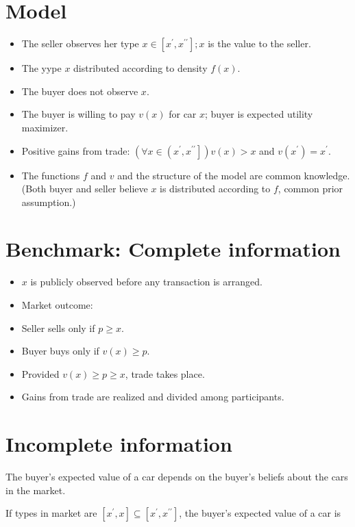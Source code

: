 \documentclass[10pt]{article}
\begin{document}
\section*{Model}
\begin{itemize}
  \item The seller observes her type $x \in\left[x^{\prime}, x^{\prime \prime}\right] ; x$ is the value to the seller.
  \item The yype $x$ distributed according to density $f(x)$.
  \item The buyer does not observe $x$.
  \item The buyer is willing to pay $v(x)$ for car $x$; buyer is expected utility maximizer.
  \item Positive gains from trade: $\left(\forall x \in\left(x^{\prime}, x^{\prime \prime}\right]\right) v(x)>x$ and $v\left(x^{\prime}\right)=x^{\prime}$.
  \item The functions $f$ and $v$ and the structure of the model are common knowledge.\\
(Both buyer and seller believe $x$ is distributed according to $f$, common prior assumption.)
\end{itemize}

\section*{Benchmark: Complete information}
\begin{itemize}
  \item $x$ is publicly observed before any transaction is arranged.
  \item Market outcome:
  \item Seller sells only if $p \geq x$.
  \item Buyer buys only if $v(x) \geq p$.
  \item Provided $v(x) \geq p \geq x$, trade takes place.
  \item Gains from trade are realized and divided among participants.
\end{itemize}

\section*{Incomplete information}
The buyer's expected value of a car depends on the buyer's beliefs about the cars in the market.

If types in market are $\left[x^{\prime}, x\right] \subseteq\left[x^{\prime}, x^{\prime \prime}\right]$, the buyer's expected value of a car is
\end{document}
